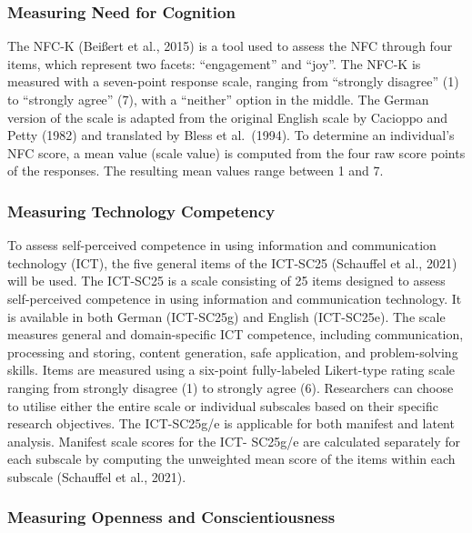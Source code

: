 \documentclass[
  12pt,
  a4paper,
  twoside]{article}
\begin{document}
\subsubsection{Measuring Need for Cognition}\label{measuring-need-for-cognition}

The NFC-K (Beißert et al., 2015) is a tool used to assess the
NFC through four items, which represent two facets: ``engagement'' and ``joy''. The
NFC-K is measured with a seven-point response scale, ranging from ``strongly
disagree'' (1) to ``strongly agree'' (7), with a ``neither'' option in the middle. The
German version of the scale is adapted from the original English scale by Cacioppo
and Petty (1982) and translated by Bless et al.~(1994). To determine an individual's NFC score, a mean value
(scale value) is computed from the four raw score points of the responses. The
resulting mean values range between 1 and 7.

\subsubsection{Measuring Technology Competency}\label{measuring-technology-competency}

To assess self-perceived competence in using information and
communication technology (ICT), the five general items of the ICT-SC25 (Schauffel
et al., 2021) will be used. The ICT-SC25 is a scale consisting of 25 items designed to
assess self-perceived competence in using information and communication
technology. It is available in both German (ICT-SC25g) and English (ICT-SC25e). The
scale measures general and domain-specific ICT competence, including
communication, processing and storing, content generation, safe application, and
problem-solving skills. Items are measured using a six-point fully-labeled Likert-type
rating scale ranging from strongly disagree (1) to strongly agree (6). Researchers can choose to
utilise either the entire scale or individual subscales based on their specific research objectives. The ICT-SC25g/e
is applicable for both manifest and latent analysis. Manifest scale scores for the ICT-
SC25g/e are calculated separately for each subscale by computing the unweighted
mean score of the items within each subscale (Schauffel et al., 2021).

\subsubsection{Measuring Openness and Conscientiousness}\label{measuring-openness-and-conscientiousness}
\end{document}
